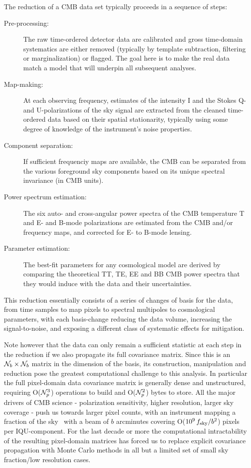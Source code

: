 The reduction of a CMB data set typically proceeds in a sequence of steps:
\begin{description}
\item[ Pre-processing:] The raw time-ordered detector data are calibrated and gross time-domain systematics are either removed (typically by template subtraction, filtering or marginalization) or flagged. The goal here is to make the real data match a model that will underpin all subsequent analyses.
\item[Map-making:] At each observing frequency, estimates of the intensity I and the Stokes Q- and U-polarizations of the sky signal are extracted from the cleaned time-ordered data based on their spatial stationarity, typically using some degree of knowledge of the instrument's noise properties.
\item[Component separation:] If sufficient frequenciy maps are available, the CMB can be separated from the various foreground sky components based on its unique spectral invariance (in CMB units).
\item[Power spectrum estimation:] The six auto- and cross-angular power spectra of the CMB temperature T and E- and B-mode polarizations are estimated from the CMB and/or frequency maps, and corrected for E- to B-mode lensing.
\item[Parameter estimation:] The best-fit parameters for any cosmological model are derived by comparing the theoretical TT, TE, EE and BB CMB power spectra that they would induce with the data and their uncertainties.
\end{description}

This reduction essentially consists of a series of changes of basis for the data, from time samples to map pixels to spectral multipoles to cosmological parameters, with each basis-change reducing the data volume, increasing the signal-to-noise, and exposing a different class of systematic effects for mitigation.

Note however that the data can only remain a sufficient statistic at each step in the reduction if we also propagate its full covariance matrix. Since this is an ${\cal N}_b \times {\cal N}_b$ matrix in the dimension of the basis, its construction, manipulation and reduction pose the greatest computational challenge to this analysis. In particular the full pixel-domain data covariance matrix is generally dense and unstructured, requiring O(${\cal N}_p^3$) operations to build and O(${\cal N}_p^2$) bytes to store. All the major drivers of CMB science - polarization sensitivity, higher resolution, larger sky coverage - push us towards larger pixel counts, with an instrument mapping a fraction of the sky \fsky\ with a beam of $b$ arcminutes covering O($10^9 \, f_\mathrm{sky}/b^2$) pixels per IQU-component. For the last decade or more the computational intractability of the resulting pixel-domain matrices has forced us to replace explicit covariance propagation with Monte Carlo methods in all but a limited set of small sky fraction/low resolution cases.

